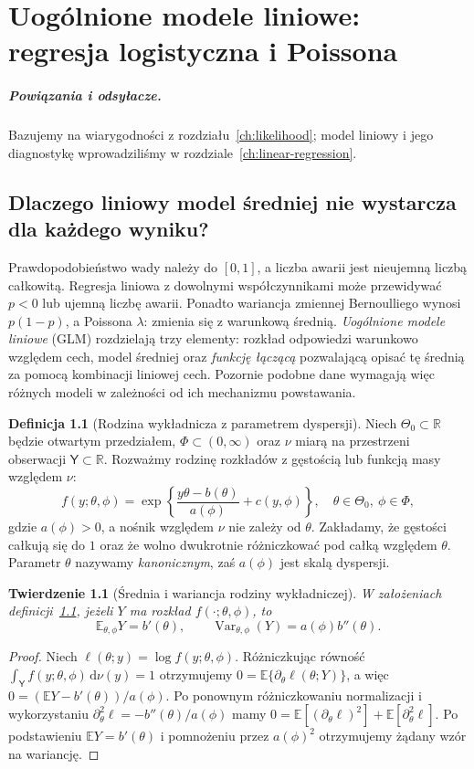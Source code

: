 \documentclass[11pt,a4paper,oneside]{report}
\numberwithin{equation}{chapter}
\theoremstyle{plain}
\newtheorem{twierdzenie}{Twierdzenie}[chapter]
\theoremstyle{definition}
\newtheorem{definicja}{Definicja}[chapter]
\theoremstyle{remark}
\newcommand{\R}{\mathbb R}
\newcommand{\E}{\mathbb E}
\newcommand{\Var}{\operatorname{Var}}
\newcommand{\dd}{\mathrm d}
\begin{document}
\chapter{Uogólnione modele liniowe: regresja logistyczna i Poissona}
\label{ch:glm}
\paragraph{Powiązania i odsyłacze.} Bazujemy na wiarygodności z rozdziału~\ref{ch:likelihood}; model liniowy i jego diagnostykę wprowadziliśmy w rozdziale~\ref{ch:linear-regression}.


\section{Dlaczego liniowy model średniej nie wystarcza dla każdego wyniku?}
Prawdopodobieństwo wady należy do $[0,1]$, a liczba
awarii jest nieujemną liczbą całkowitą. Regresja
liniowa z dowolnymi współczynnikami może przewidywać
$p<0$ lub ujemną liczbę awarii. Ponadto wariancja
zmiennej Bernoulliego wynosi $p(1-p)$, a Poissona
$\lambda$: zmienia się z warunkową średnią.
\emph{Uogólnione modele liniowe} (GLM) rozdzielają
trzy elementy: rozkład odpowiedzi warunkowo względem
cech, model średniej oraz \emph{funkcję łączącą}
pozwalającą opisać tę średnią za pomocą kombinacji
liniowej cech. Pozornie podobne dane wymagają więc
różnych modeli w zależności od ich mechanizmu powstawania.

\begin{definicja}[Rodzina wykładnicza z parametrem dyspersji]
\label{def:glm-family}
Niech $\Theta_0\subset\R$ będzie otwartym przedziałem,
$\Phi\subset(0,\infty)$ oraz $\nu$ miarą na przestrzeni
obserwacji $\mathsf Y\subset\R$. Rozważmy rodzinę
rozkładów z gęstością lub funkcją masy względem $\nu$:
\[
 f(y;\theta,\phi)=\exp\!\left\{
 \frac{y\theta-b(\theta)}{a(\phi)}+c(y,\phi)\right\},
 \quad \theta\in\Theta_0,\ \phi\in\Phi,
\]
gdzie $a(\phi)>0$, a nośnik względem $\nu$ nie zależy
od $\theta$. Zakładamy, że gęstości całkują się do $1$
oraz że wolno dwukrotnie różniczkować pod całką względem
$\theta$. Parametr $\theta$ nazywamy \emph{kanonicznym},
zaś $a(\phi)$ jest skalą dyspersji.
\end{definicja}

\begin{twierdzenie}[Średnia i wariancja rodziny wykładniczej]
\label{thm:glm-moments}
W założeniach definicji~\ref{def:glm-family}, jeżeli
$Y$ ma rozkład $f(\cdot;\theta,\phi)$, to
\[
 \E_{\theta,\phi}Y=b'(\theta),\qquad
 \Var_{\theta,\phi}(Y)=a(\phi)b''(\theta).
\]
\end{twierdzenie}
\begin{proof}
Niech $\ell(\theta;y)=\log f(y;\theta,\phi)$.
Różniczkując równość
$\int_{\mathsf Y}f(y;\theta,\phi)\,\dd\nu(y)=1$
otrzymujemy
$0=\E\{\partial_\theta\ell(\theta;Y)\}$,
a więc $0=(\E Y-b'(\theta))/a(\phi)$.
Po ponownym różniczkowaniu normalizacji i
wykorzystaniu
$\partial_\theta^2\ell=-b''(\theta)/a(\phi)$
mamy
$0=\E[(\partial_\theta\ell)^2]+
\E[\partial_\theta^2\ell]$.
Po podstawieniu $\E Y=b'(\theta)$ i pomnożeniu przez
$a(\phi)^2$ otrzymujemy żądany wzór na wariancję.
\end{proof}
\end{document}
